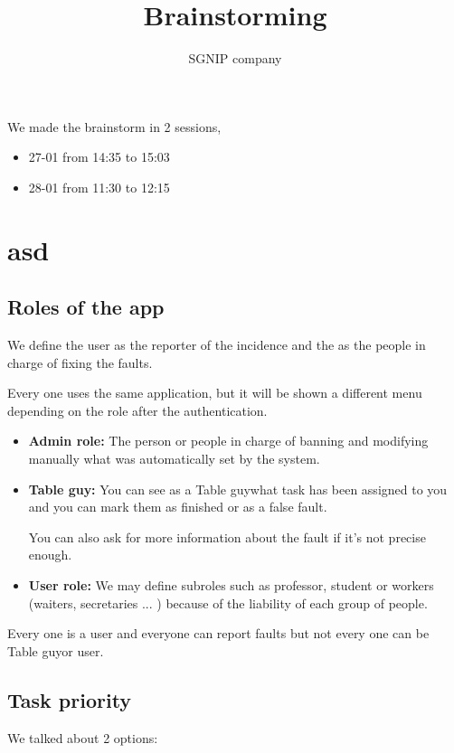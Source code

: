 \documentclass[nobuilddate,nochap]{apuntes}
\title{Brainstorming}
\author{SGNIP company}
\newcommand{\tbg}{Table guy}
\newcommand{\tbg}{Table guys}
\begin{document}
\maketitle
\newpage

We made the brainstorm in 2 sessions, 

\begin{itemize}
\item 27-01 from 14:35 to 15:03
\item 28-01 from 11:30 to 12:15
\end{itemize}

\section{asd}

\subsection{Roles of the app}
We define the user as the reporter of the incidence and the \tbgs as the people in charge of fixing the faults.


Every one uses the same application, but it will be shown a different menu depending on the role after the authentication.

\begin{itemize}
\item \textbf{Admin role: } The person or people in charge of banning and modifying manually what was automatically set by the system.

\item\textbf{\tbg:} You can see as a \tbg what task has been assigned to you and you can mark them as finished or as a false fault. 

You can also ask for more information about the fault if it's not precise enough.

\item \textbf{User role: }  We may define subroles such as professor, student or workers (waiters, secretaries ... ) because of the liability of each group of people.

\end{itemize}

Every one is a user and everyone can report faults but not  every one can be \tbg or user.

\subsection{Task priority}
We talked about 2 options:
\end{document}

